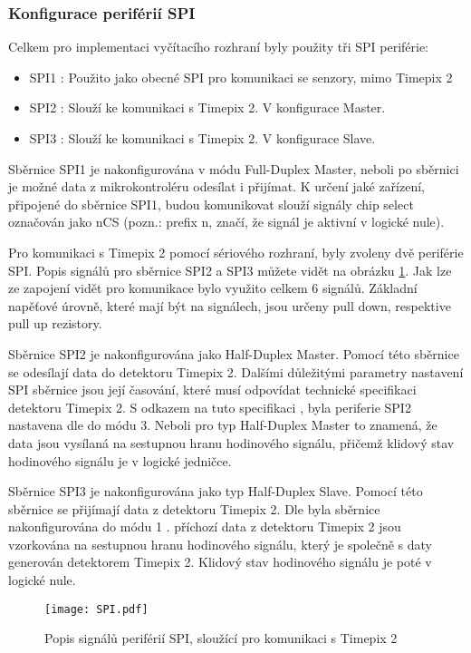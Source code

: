 	\subsubsection{Konfigurace periférií SPI}
	Celkem pro implementaci vyčítacího rozhraní byly použity tři SPI periférie:
	 \begin{itemize}
	 	\setlength\itemsep{0.005em}
	 	\item SPI1 : Použito jako obecné SPI pro komunikaci se senzory, mimo Timepix 2
	 	\item SPI2 : Slouží ke komunikaci s Timepix 2. V konfigurace Master. 
	 	\item SPI3 : Slouží ke komunikaci s Timepix 2. V konfigurace Slave.
	 \end{itemize}
 	Sběrnice SPI1 je nakonfigurována v módu Full-Duplex Master, neboli po sběrnici je možné data z mikrokontroléru odesílat i přijímat. K určení jaké zařízení, připojené do sběrnice SPI1, budou komunikovat slouží signály chip select označován jako nCS (pozn.: prefix n, značí, že signál je aktivní v logické nule). 
 	\par Pro komunikaci s Timepix 2 pomocí sériového rozhraní, byly zvoleny dvě periférie SPI. Popis signálů pro sběrnice SPI2 a SPI3 můžete vidět na obrázku \ref{fig:SPI}. Jak lze ze zapojení vidět pro komunikace bylo využito celkem 6 signálů. Základní napěťové úrovně, které mají být na signálech, jsou určeny pull down, respektive pull up rezistory. %
 	
 	\par Sběrnice SPI2 je nakonfigurována jako Half-Duplex Master. Pomocí této sběrnice se odesílají data do detektoru Timepix 2. Dalšími důležitými parametry nastavení SPI sběrnice jsou její časování, které musí odpovídat technické specifikaci detektoru Timepix 2. S odkazem na tuto specifikaci \cite{Timepix2}, byla periferie SPI2 nastavena dle \cite{SPI} do módu 3. Neboli pro typ Half-Duplex Master to znamená, že data jsou vysílaná na sestupnou hranu hodinového signálu, přičemž klidový stav hodinového signálu je v logické jedničce.
 	
 	\par Sběrnice SPI3 je nakonfigurována jako typ Half-Duplex Slave. Pomocí této sběrnice se přijímají data z detektoru Timepix 2. Dle \cite{Timepix2} byla sběrnice nakonfigurována do módu 1 \cite{SPI}. příchozí data z detektoru Timepix 2 jsou vzorkována na sestupnou hranu hodinového signálu, který je společně s daty generován detektorem Timepix 2. Klidový stav hodinového signálu je poté v logické nule.
	\begin{figure}[h!]
 		\centering
 		\captionsetup{justification=centering}
 		\texttt{[image: SPI.pdf]}
 		\caption{Popis signálů periférií SPI, sloužící pro komunikaci s Timepix 2} 
 		\label{fig:SPI}
 	\end{figure}
 	
